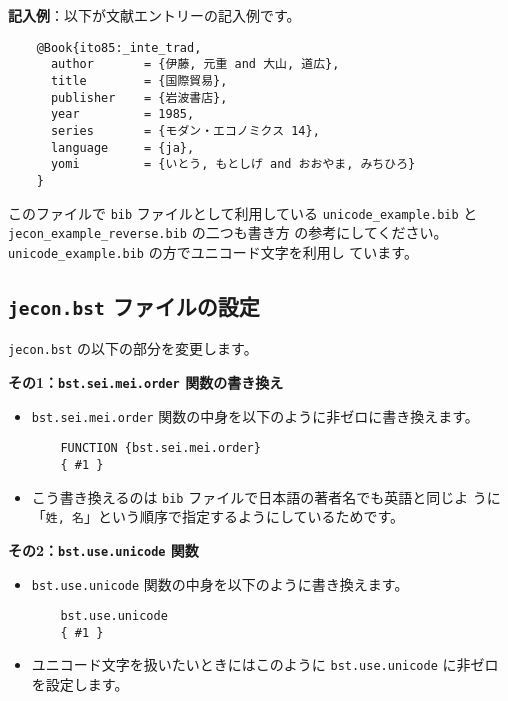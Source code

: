 \documentclass[a4paper,10pt]{bxjsarticle}
\begin{document}
\vspace*{1em}

\textbf{記入例}：以下が文献エントリーの記入例です。
\begin{verbatim}
    @Book{ito85:_inte_trad,
      author       = {伊藤, 元重 and 大山, 道広},
      title        = {国際貿易},
      publisher    = {岩波書店},
      year         = 1985,
      series       = {モダン・エコノミクス 14},
      language     = {ja},
      yomi         = {いとう, もとしげ and おおやま, みちひろ}
    }
\end{verbatim}

このファイルで \texttt{bib} ファイルとして利用している
\texttt{unicode\_example.bib} と \texttt{jecon\_example\_reverse.bib} の二つも書き方
の参考にしてください。\texttt{unicode\_example.bib} の方でユニコード文字を利用し
ています。

\subsection{\texttt{jecon.bst} ファイルの設定}

\texttt{jecon.bst} の以下の部分を変更します。
\vspace*{1em}

\textbf{その1：\texttt{bst.sei.mei.order} 関数の書き換え}

\begin{itemize}
 \item \texttt{bst.sei.mei.order} 関数の中身を以下のように非ゼロに書き換えます。
\begin{verbatim}
    FUNCTION {bst.sei.mei.order}
    { #1 }
\end{verbatim}
 \item こう書き換えるのは \texttt{bib} ファイルで日本語の著者名でも英語と同じよ
       うに「\verb|姓, 名|」という順序で指定するようにしているためです。
\end{itemize}
\vspace*{1em}

\textbf{その2：\texttt{bst.use.unicode} 関数}
\begin{itemize}
 \item \texttt{bst.use.unicode} 関数の中身を以下のように書き換えます。
\begin{verbatim}
    bst.use.unicode
    { #1 }
\end{verbatim}
 \item ユニコード文字を扱いたいときにはこのように
       \texttt{bst.use.unicode} に非ゼロを設定します。
\end{itemize}
\vspace*{1em}
\end{document}
